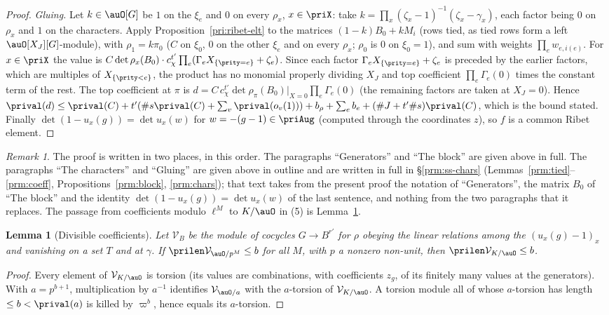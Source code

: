 \documentclass[10pt]{amsart}
\newtheorem{lemma}[theorem]{Lemma}
\theoremstyle{definition}
\theoremstyle{remark}
\newtheorem{remark}[theorem]{Remark}
\begin{document}
\begin{proof}
\emph{Gluing.} Let $k\in\auO[G]$ be $1$ on the $\xi_e$ and $0$ on every $\rho_x$, $x\in\priX$: take
$k=\prod_x(\zeta_x-1)^{-1}(\zeta_x-\gamma_x)$, each factor being $0$ on $\rho_x$ and $1$ on the
characters. Apply Proposition~\ref{pri:ribet-elt} to the matrices
$(1-k)B_0+kM_i$ (rows tied, as tied rows form a left $\auO[X_J][G]$-module), with $\rho_1=k\pi_0$ ($C$
on $\xi_0$, $0$ on the other $\xi_e$ and on every $\rho_x$; $\rho_0$ is $0$ on $\xi_0=1$), and sum with weights $\prod_ew_{e,i(e)}$.
For $x\in\priX$ the value is $C\det\rho_x(B_0)\cdot c_\chi^{t'}\prod_e(\Gamma_eX_{\{\prity=e\}}+
\zeta_e)$. Since each factor $\Gamma_eX_{\{\prity=e\}}+\zeta_e$ is preceded by the earlier factors,
which are multiples of $X_{\{\prity<e\}}$, the product has no monomial properly dividing $X_J$ and
top coefficient $\prod_e\Gamma_e(0)$ times the constant term of the rest. The top coefficient at
$\pi$ is $d=C\,c_\chi^{t'}\det\rho_\pi(B_0)|_{X=0}\prod_e\Gamma_e(0)$ (the remaining factors are taken
at $X_J=0$). Hence $\prival(d)\le\prival(C)+t'(\#s\prival(C)+\sum_v\prival(o_v(1)))+b_\rho+\sum_eb_e+
(\#J+t'\#s)\prival(C)$, which is the bound stated. Finally $\det(1-u_x(g))=\det u_x(w)$ for
$w=-(g-1)\in\priAug$ (computed through the coordinates $z$), so $f$ is a common Ribet element.
\end{proof}

\begin{remark}
The proof is written in two places, in this order. The paragraphs ``Generators'' and ``The block'' are given above in full. The paragraphs ``The characters'' and ``Gluing'' are given above in outline and are written in full in \S\ref{prm:ss-chars}
(Lemmas~\ref{prm:tied}--\ref{prm:coeff}, Propositions~\ref{prm:block}, \ref{prm:chars}); that text takes from the present proof the notation of ``Generators'', the matrix $B_0$ of ``The block'' and the identity $\det(1-u_x(g))=\det u_x(w)$ of the last sentence, and nothing from the two paragraphs that it replaces. The passage
from coefficients modulo $\ell^M$ to $K/\auO$ in (5) is Lemma~\ref{pri:divisible}.
\end{remark}

\begin{lemma}[Divisible coefficients]\label{pri:divisible}
Let $\mathcal V_B$ be the module of cocycles $G\to B^{r'}$ for $\rho$ obeying the linear relations
among the $(u_x(g)-1)_x$ and vanishing on a set $T$ and at $\gamma$. If $\prilen\mathcal V_{\auO/
p^M}\le b$ for all $M$, with $p$ a nonzero non-unit, then $\prilen\mathcal V_{K/\auO}\le b$.
\end{lemma}
\begin{proof}
Every element of $\mathcal V_{K/\auO}$ is torsion (its values are combinations, with coefficients
$z_g$, of its finitely many values at the generators). With $a=p^{b+1}$, multiplication by $a^{-1}$
identifies $\mathcal V_{\auO/a}$ with the $a$-torsion of $\mathcal V_{K/\auO}$. A torsion module all of
whose $a$-torsion has length $\le b<\prival(a)$ is killed by $\varpi^b$, hence equals its
$a$-torsion.
\end{proof}
\end{document}
